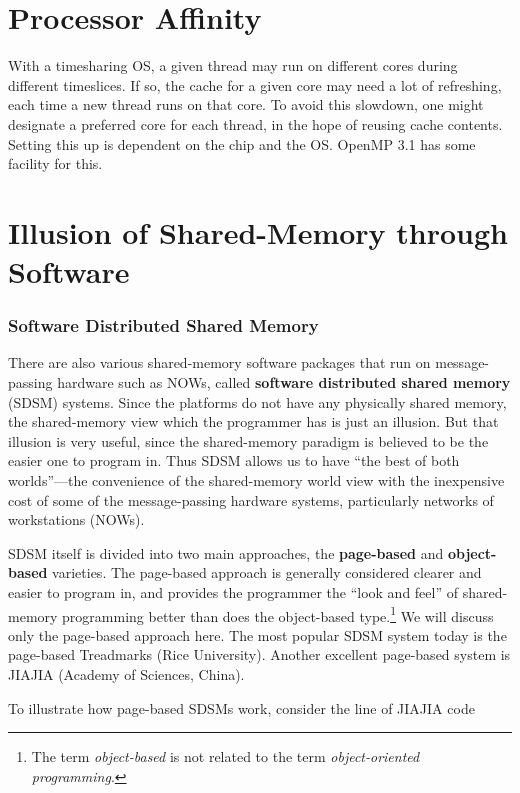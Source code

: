 \section{Processor Affinity}

With a timesharing OS, a given thread may run on different cores during
different timeslices.  If so, the cache for a given core may need a lot
of refreshing, each time a new thread runs on that core.  To avoid this
slowdown, one might designate a preferred core for each thread, in the
hope of reusing cache contents.  Setting this up is dependent on the
chip and the OS.  OpenMP 3.1 has some facility for this.

\section{Illusion of Shared-Memory through Software}
\label{sdsm}

\subsubsection{Software Distributed Shared Memory}  

There are also various shared-memory software packages that run on
message-passing hardware such as NOWs, called \textbf{software
distributed shared memory} (SDSM) systems.  Since the platforms do not
have any physically shared memory, the shared-memory view which the
programmer has is just an illusion.  But that illusion is very useful,
since the shared-memory paradigm is believed to be the easier one to
program in.  Thus SDSM allows us to have ``the best of both
worlds''---the convenience of the shared-memory world view with the
inexpensive cost of some of the message-passing hardware systems,
particularly networks of workstations (NOWs). 

SDSM itself is divided into two main approaches, the {\bf page-based}
and {\bf object-based} varieties.  The page-based approach is generally
considered clearer and easier to program in, and provides the programmer
the ``look and feel'' of shared-memory programming better than does the
object-based type.\footnote{The term {\it object-based} is not related
to the term {\it object-oriented programming}.}  We will discuss only
the page-based approach here.  The most popular SDSM system today is the
page-based Treadmarks (Rice University).  Another excellent page-based
system is JIAJIA (Academy of Sciences, China).  

To illustrate how page-based SDSMs work, consider the line of JIAJIA code

